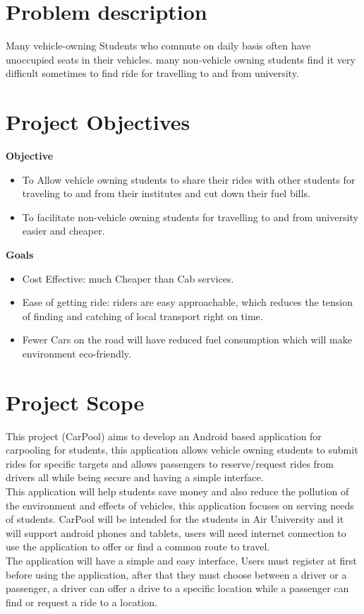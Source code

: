 \section{Problem description}
Many vehicle-owning Students who commute on daily basis often have unoccupied seats in their vehicles. many non-vehicle owning students find it very difficult sometimes to find ride for travelling to and from university.

\section{Project Objectives}
\textbf{Objective}
\begin{itemize}

\item To Allow vehicle owning students to share their rides with other students for traveling to and from their institutes and cut down their fuel bills.

\item To facilitate non-vehicle owning students for travelling to and from university easier and cheaper.

\end{itemize}
\textbf{Goals}
\begin{itemize}

\item Cost Effective: much Cheaper than Cab services.
\item Ease of getting ride: riders are easy approachable, which reduces the tension of finding and catching of local transport right on time.
\item Fewer Cars on the road will have reduced fuel consumption which will make environment eco-friendly.
\end{itemize}

\section{Project Scope}
This project (CarPool) aims to develop an Android based application for carpooling for students, this application allows vehicle owning students to submit rides for specific targets and allows passengers to reserve/request rides from drivers all while being secure and having a simple interface.
\\ This application will help students save money and also reduce the pollution of the environment and effects of vehicles, this application focuses on serving needs of students. CarPool will be intended for the students in Air University and it will support android phones and tablets, users will need internet connection to use the application to offer or find a common route to travel.
\\ The application will have a simple and easy interface, Users must register at first before using the application, after that they must choose between a driver or a passenger, a driver can offer a drive to a specific location while a passenger can find or request a ride to a location.

